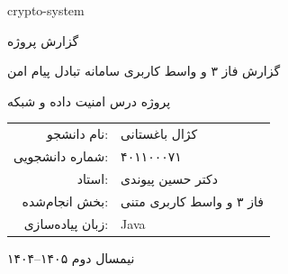 \documentclass[12pt,a4paper]{article}
\newcommand{\projecttitle}{گزارش فاز ۳ و واسط کاربری سامانه تبادل پیام امن}
\newcommand{\studentname}{کژال باغستانی}
\newcommand{\studentid}{۴۰۱۱۰۰۰۷۱}
\newcommand{\coursename}{امنیت داده و شبکه}
\newcommand{\instructor}{دکتر حسین پیوندی}
\begin{document}
\begin{titlepage}
\centering
\vspace*{1cm}
{\Large crypto-system\par}
\vspace{0.4cm}
{\large گزارش پروژه\par}
\vspace{1.5cm}
{\Huge \projecttitle\par}
\vspace{1cm}
{\Large پروژه درس \coursename\par}
\vspace{1.2cm}
\begin{tabular}{rl}
نام دانشجو: & \studentname \\
شماره دانشجویی: & \studentid \\
استاد: & \instructor \\
بخش انجام‌شده: & فاز ۳ و واسط کاربری متنی \\
زبان پیاده‌سازی: & Java \\
\end{tabular}
\vfill
{\large نیمسال دوم ۱۴۰۵--۱۴۰۴\par}
\end{titlepage}

\tableofcontents
\newpage
\end{document}
